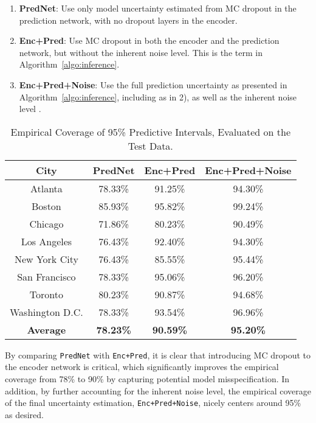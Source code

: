 \documentclass[conference,compsoc,final]{IEEEtran}
\begin{document}
	\begin{enumerate}
	\item {\bf PredNet}: Use only model uncertainty estimated from MC dropout in the prediction network, with no dropout layers in the encoder.
	\item {\bf Enc+Pred}: Use MC dropout in both the encoder and the prediction network, but without the inherent noise level. This is the term  in Algorithm~\ref{algo:inference}. 
    \item {\bf Enc+Pred+Noise}: Use the full prediction uncertainty  as presented in Algorithm~\ref{algo:inference},  including  as in 2), as well as the inherent noise level .
	\end{enumerate}
    
\begin{table}[!t]
\renewcommand{\arraystretch}{1.3}
\caption{Empirical Coverage of 95\% Predictive Intervals, Evaluated on the Test Data.
}
\label{tab:coverage}
\centering
\begin{tabular}{| c | c | c | c |}
\hline
{\bf City} & {\bf PredNet}  & {\bf Enc+Pred} & {\bf Enc+Pred+Noise}\\
\hline
Atlanta & 78.33\% & 91.25\% & 94.30\% \\
\hline
Boston & 85.93\% & 95.82\% & 99.24\% \\
\hline
Chicago & 71.86\% & 80.23\% & 90.49\% \\
\hline
Los Angeles & 76.43\% & 92.40\%  & 94.30\% \\
\hline
New York City & 76.43\% & 85.55\%  & 95.44\% \\
\hline
San Francisco & 78.33\% & 95.06\% & 96.20\% \\
\hline
Toronto & 80.23\% & 90.87\% & 94.68\% \\
\hline
Washington D.C. & 78.33\% & 93.54\% & 96.96\% \\
\hline
{\bf Average} & {\bf 78.23\%} & {\bf 90.59\%} &  {\bf 95.20\%} \\
\hline
\end{tabular}
\end{table}
By comparing {\tt PredNet} with {\tt Enc+Pred}, it is clear that introducing MC dropout to the encoder network is critical, which significantly improves the empirical coverage from 78\% to 90\% by capturing potential model misspecification. In addition, by further accounting for the inherent noise level, the empirical coverage of the final uncertainty estimation, {\tt Enc+Pred+Noise}, nicely centers around 95\% as desired.  
\end{document}
